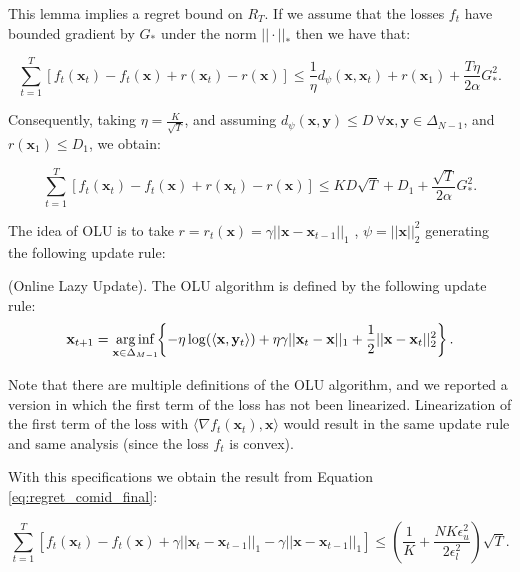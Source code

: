 This lemma implies a regret bound on $R_T$. If we assume that the losses $f_t$ have bounded gradient by $G_*$ under the norm $||\cdot||_*$ then we have that: 

\begin{equation}
\sum\limits_{t=1}^T[f_t(\mathbf x_t)-f_t(\mathbf x)+r(\mathbf x_t)-r(\mathbf x)]\le\frac{1}{\eta}d_\psi(\mathbf x,\mathbf x_t)+r(\mathbf x_1)+\frac{T\eta}{2\alpha}G_*^2.
\end{equation}

Consequently, taking $\eta=\frac{K}{\sqrt T}$, and assuming $d_\psi(\mathbf x,\mathbf y)\le D\ \forall\mathbf x,\mathbf y\in\Delta_{N-1}$, and $r(\mathbf x_1)\le D_1$, we obtain:

\begin{equation}\label{eq:regret_comid_final}
\sum\limits_{t=1}^T[f_t(\mathbf x_t)-f_t(\mathbf x)+r(\mathbf x_t)-r(\mathbf x)]\le KD\sqrt{T} + D_1+\frac{\sqrt{T}}{2\alpha}G_*^2.
\end{equation}

The idea of OLU is to take $r=r_t(\mathbf x)=\gamma||\mathbf x-\mathbf x_{t-1}||_1$ \cite{das2014online}, $\psi=||\mathbf x||_2^2$ generating the following update rule:

\begin{definition}(Online Lazy Update).\label{def:update_OLU}
The OLU algorithm is defined by the following update rule:
\begin{equation}\label{eq:update_OLU}
    \mathbf{x}_{t+1}=\arginf\limits_{\mathbf{x} \in \Delta_{M-1}} \hspace{-0.1cm} \left\{ -\eta\log(\langle \mathbf x,\mathbf y_t\rangle) + \eta \gamma ||\mathbf x_t-\mathbf x||_1 + \frac{1}{2}||\mathbf x-\mathbf x_t||^2_2 \right\}.
\end{equation}

\end{definition}

Note that there are multiple definitions of the OLU algorithm, and we reported a version in which the first term of the loss has not been linearized. Linearization of the first term of the loss with $\langle\nabla f_t(\mathbf x_t),\mathbf x\rangle$ would result in the same update rule and same analysis (since the loss $f_t$ is convex).

With this specifications we obtain the result from Equation \eqref{eq:regret_comid_final}:

\begin{equation}
\sum\limits_{t=1}^T[f_t(\mathbf x_t)-f_t(\mathbf x)+\gamma||\mathbf x_t-\mathbf x_{t-1}||_1-\gamma||\mathbf x-\mathbf x_{t-1}||_1]\le \left( \frac{1}{K} + \frac{N K \epsilon_u^2 }{2 \epsilon_l^2} \right) \sqrt{T}.
\end{equation}

